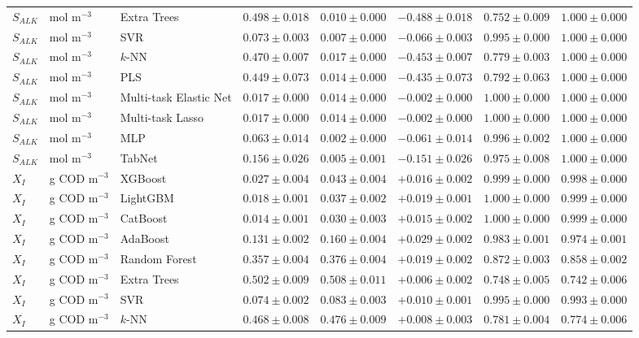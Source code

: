 \begin{longtable}{llp{3.1cm}rrrrr}
$S_{ALK}$ & mol m$^{-3}$ & Extra Trees & $0.498\pm0.018$ & $0.010\pm0.000$ & $-0.488\pm0.018$ & $0.752\pm0.009$ & $1.000\pm0.000$ \\
$S_{ALK}$ & mol m$^{-3}$ & SVR & $0.073\pm0.003$ & $0.007\pm0.000$ & $-0.066\pm0.003$ & $0.995\pm0.000$ & $1.000\pm0.000$ \\
$S_{ALK}$ & mol m$^{-3}$ & $k$-NN & $0.470\pm0.007$ & $0.017\pm0.000$ & $-0.453\pm0.007$ & $0.779\pm0.003$ & $1.000\pm0.000$ \\
$S_{ALK}$ & mol m$^{-3}$ & PLS & $0.449\pm0.073$ & $0.014\pm0.000$ & $-0.435\pm0.073$ & $0.792\pm0.063$ & $1.000\pm0.000$ \\
$S_{ALK}$ & mol m$^{-3}$ & Multi-task Elastic Net & $0.017\pm0.000$ & $0.014\pm0.000$ & $-0.002\pm0.000$ & $1.000\pm0.000$ & $1.000\pm0.000$ \\
$S_{ALK}$ & mol m$^{-3}$ & Multi-task Lasso & $0.017\pm0.000$ & $0.014\pm0.000$ & $-0.002\pm0.000$ & $1.000\pm0.000$ & $1.000\pm0.000$ \\
$S_{ALK}$ & mol m$^{-3}$ & MLP & $0.063\pm0.014$ & $0.002\pm0.000$ & $-0.061\pm0.014$ & $0.996\pm0.002$ & $1.000\pm0.000$ \\
$S_{ALK}$ & mol m$^{-3}$ & TabNet & $0.156\pm0.026$ & $0.005\pm0.001$ & $-0.151\pm0.026$ & $0.975\pm0.008$ & $1.000\pm0.000$ \\
$X_{I}$ & g COD m$^{-3}$ & XGBoost & $0.027\pm0.004$ & $0.043\pm0.004$ & $+0.016\pm0.002$ & $0.999\pm0.000$ & $0.998\pm0.000$ \\
$X_{I}$ & g COD m$^{-3}$ & LightGBM & $0.018\pm0.001$ & $0.037\pm0.002$ & $+0.019\pm0.001$ & $1.000\pm0.000$ & $0.999\pm0.000$ \\
$X_{I}$ & g COD m$^{-3}$ & CatBoost & $0.014\pm0.001$ & $0.030\pm0.003$ & $+0.015\pm0.002$ & $1.000\pm0.000$ & $0.999\pm0.000$ \\
$X_{I}$ & g COD m$^{-3}$ & AdaBoost & $0.131\pm0.002$ & $0.160\pm0.004$ & $+0.029\pm0.002$ & $0.983\pm0.001$ & $0.974\pm0.001$ \\
$X_{I}$ & g COD m$^{-3}$ & Random Forest & $0.357\pm0.004$ & $0.376\pm0.004$ & $+0.019\pm0.002$ & $0.872\pm0.003$ & $0.858\pm0.002$ \\
$X_{I}$ & g COD m$^{-3}$ & Extra Trees & $0.502\pm0.009$ & $0.508\pm0.011$ & $+0.006\pm0.002$ & $0.748\pm0.005$ & $0.742\pm0.006$ \\
$X_{I}$ & g COD m$^{-3}$ & SVR & $0.074\pm0.002$ & $0.083\pm0.003$ & $+0.010\pm0.001$ & $0.995\pm0.000$ & $0.993\pm0.000$ \\
$X_{I}$ & g COD m$^{-3}$ & $k$-NN & $0.468\pm0.008$ & $0.476\pm0.009$ & $+0.008\pm0.003$ & $0.781\pm0.004$ & $0.774\pm0.006$ \\

\end{longtable}
